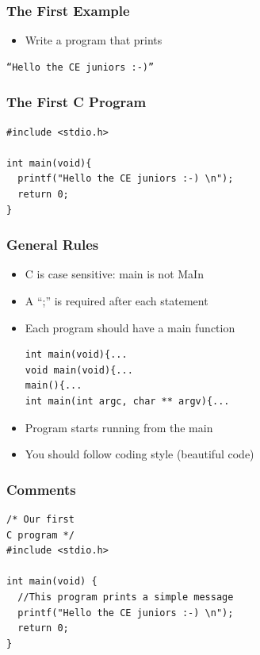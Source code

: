 \documentclass{../c-lecture}
\begin{document}
\begin{frame}[fragile]
  \frametitle{The First Example}
  \begin{itemize}
    \item Write a program that prints
  \end{itemize}
  \begin{verbatim}
“Hello the CE juniors :-)”
  \end{verbatim}
\end{frame}

\begin{frame}[fragile]
  \frametitle{The First C Program}
  \begin{verbatim}
#include <stdio.h>

int main(void){
  printf("Hello the CE juniors :-) \n");
  return 0;
}
  \end{verbatim}
\end{frame}

\begin{frame}[fragile]
  \frametitle{General Rules}
  \begin{itemize}
    \item C is case sensitive: {\color{LimeGreen} main} is not
      {\color{Red} MaIn}

    \item A ``;'' is required after each statement
    \item Each program should have a
      {\color{Orange} main} function

    \begin{verbatim}
int main(void){...
void main(void){...
main(){...
int main(int argc, char ** argv){...
    \end{verbatim}

    \item Program starts running from the main
    \item You should follow coding style (beautiful code)
  \end{itemize}
\end{frame}

\begin{frame}[fragile]
  \frametitle{Comments}
    \begin{verbatim}
/* Our first
C program */
#include <stdio.h>

int main(void) {
  //This program prints a simple message
  printf("Hello the CE juniors :-) \n");
  return 0;
}
  \end{verbatim}
\end{frame}
\end{document}
